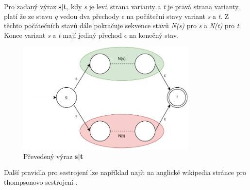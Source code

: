 Pro zadaný výraz \textbf{s|t}, kdy \textit{s} je levá strana varianty a \textit{t} je pravá strana varianty, platí že ze stavu \textit{q} vedou dva přechody
\textit{$\epsilon$} na počáteční stavy variant \textit{s} a \textit{t}. Z těchto počátečních stavů dále pokračuje sekvence stavů \textit{N(s)} pro \textit{s} a \textit{N(t)} pro \textit{t}.
Konce variant \textit{s} a \textit{t} mají jediný přechod \textit{$\epsilon$} na konečný stav.
\begin{figure}[!h]
	\centering
	\includegraphics[width=0.8\textwidth]{Figures/NFA_union.pdf}
	\caption{Převedený výraz \textbf{s|t}}
	\label{fig:NFAunion}
\end{figure}

Další pravidla pro sestrojení lze například najít na anglické wikipedia stránce pro thompsonovo sestrojení \cite{Wikipedia_2023}.
